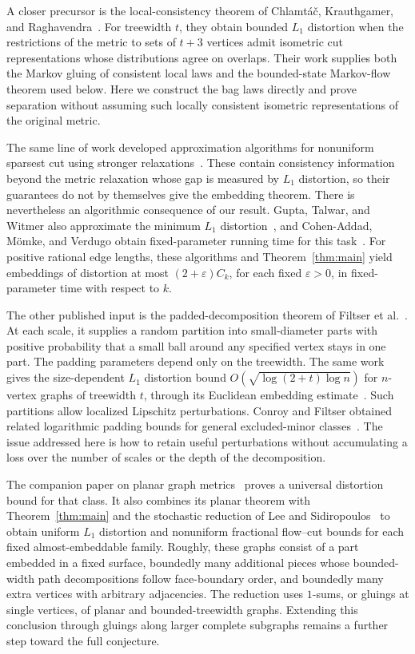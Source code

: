 A closer precursor is the local-consistency theorem of Chlamt\'{a}\v{c},
Krauthgamer, and Raghavendra~\cite[Corollary~1.2]{CKR}. For treewidth
$t$, they obtain bounded $L_1$ distortion when the restrictions of the
metric to sets of $t+3$ vertices admit isometric cut representations
whose distributions agree on overlaps. Their work supplies both
the Markov gluing of consistent local laws and the bounded-state
Markov-flow theorem used below. Here we construct the bag laws
directly and prove separation without assuming such locally
consistent isometric representations of the original metric.

The same line of work developed approximation algorithms for
nonuniform sparsest cut using stronger relaxations~\cite{CKR,
GuptaTalwarWitmer,ChalermsookEtAl,CohenAddadMomkeVerdugo}.
These contain consistency information beyond the metric relaxation
whose gap is measured by $L_1$ distortion, so their guarantees do
not by themselves give the embedding theorem. There is nevertheless
an algorithmic consequence of our result. Gupta, Talwar, and Witmer
also approximate the minimum $L_1$ distortion~\cite[Section~3.3.1]{GuptaTalwarWitmer},
and Cohen-Addad, M\"omke, and Verdugo obtain fixed-parameter running
time for this task~\cite{CohenAddadMomkeVerdugo}. For positive rational
edge lengths, these algorithms and Theorem~\ref{thm:main} yield
embeddings of distortion at most $(2+\varepsilon)C_k$, for each fixed
$\varepsilon>0$, in fixed-parameter time with respect to $k$.

The other published input is the padded-decomposition theorem of
Filtser et al.~\cite{FiltserEtAl}. At each scale, it supplies a
random partition into small-diameter parts with positive probability
that a small ball around any specified vertex stays in one part.
The padding parameters depend only on the treewidth. The same work
gives the size-dependent $L_1$ distortion bound
$O(\sqrt{\log(2+t)\log n})$ for $n$-vertex graphs of treewidth $t$,
through its Euclidean embedding estimate~\cite{FiltserEtAl}. Such partitions
allow localized Lipschitz perturbations. Conroy and Filtser obtained related logarithmic
padding bounds for general excluded-minor classes~\cite{ConroyFiltser25}.
The issue addressed here is how to retain useful perturbations without accumulating a loss over
the number of scales or the depth of the decomposition.

The companion paper on planar graph metrics~\cite{OpenAIPlanar}
proves a universal distortion bound for that class. It also combines
its planar theorem with Theorem~\ref{thm:main}
and the stochastic reduction of Lee and Sidiropoulos~\cite[Theorem~1.7]{LS09Geometry}
to obtain uniform $L_1$ distortion and nonuniform fractional flow--cut
bounds for each fixed almost-embeddable family. Roughly, these graphs
consist of a part embedded in a fixed surface, boundedly many additional
pieces whose bounded-width path decompositions follow face-boundary
order, and boundedly many extra vertices with arbitrary adjacencies.
The reduction uses $1$-sums, or gluings at single vertices, of planar
and bounded-treewidth graphs. Extending this conclusion through
gluings along larger complete subgraphs remains a further step toward
the full conjecture.

